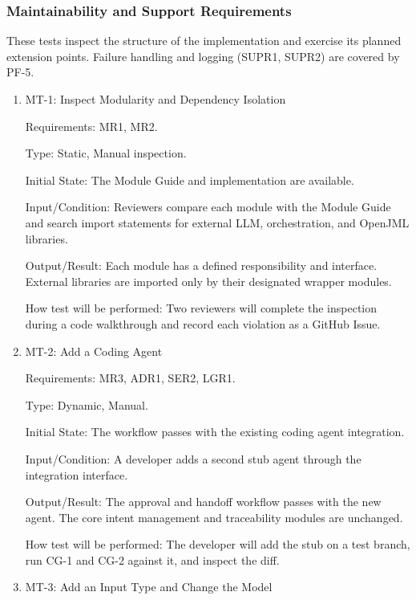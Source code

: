 \documentclass[12pt, titlepage]{article}
\begin{document}
\subsubsection{Maintainability and Support Requirements}

These tests inspect the structure of the implementation and exercise its planned
extension points. Failure handling and logging (SUPR1, SUPR2) are covered by
PF-5.

\begin{enumerate}

\item{MT-1: Inspect Modularity and Dependency Isolation\\}

Requirements: MR1, MR2.

Type: Static, Manual inspection.

Initial State: The Module Guide and implementation are available.

Input/Condition: Reviewers compare each module with the Module Guide and search
import statements for external LLM, orchestration, and OpenJML libraries.

Output/Result: Each module has a defined responsibility and interface. External
libraries are imported only by their designated wrapper modules.

How test will be performed: Two reviewers will complete the inspection during a
code walkthrough and record each violation as a GitHub Issue.

\item{MT-2: Add a Coding Agent\\}

Requirements: MR3, ADR1, SER2, LGR1.

Type: Dynamic, Manual.

Initial State: The workflow passes with the existing coding agent integration.

Input/Condition: A developer adds a second stub agent through the integration
interface.

Output/Result: The approval and handoff workflow passes with the new agent. The
core intent management and traceability modules are unchanged.

How test will be performed: The developer will add the stub on a test branch, run
CG-1 and CG-2 against it, and inspect the diff.

\item{MT-3: Add an Input Type and Change the Model\\}


\end{enumerate}
\end{document}
